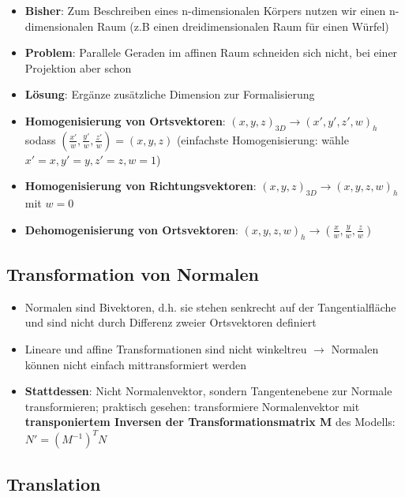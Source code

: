 \begin{itemize}
	\item \textbf{Bisher}: Zum Beschreiben eines n-dimensionalen Körpers nutzen wir einen n-dimensionalen Raum (z.B einen dreidimensionalen Raum für einen Würfel)
	\item \textbf{Problem}: Parallele Geraden im affinen Raum schneiden sich nicht, bei einer Projektion aber schon
	\item \textbf{Lösung}: Ergänze zusätzliche Dimension zur Formalisierung
	\item \textbf{Homogenisierung von Ortsvektoren}: $(x, y, z)_{3D} \rightarrow (x', y', z', w)_h$ sodass $(\frac{x'}{w}, \frac{y'}{w}, \frac{z'}{w}) = (x, y, z)$ (einfachste Homogenisierung: wähle $x' = x, y' = y, z' = z, w = 1$)
	\item \textbf{Homogenisierung von Richtungsvektoren}: $(x, y, z)_{3D} \rightarrow (x, y, z, w)_h$ mit $w = 0$
	\item \textbf{Dehomogenisierung von Ortsvektoren}: $(x, y, z, w)_h \rightarrow (\frac{x}{w}, \frac{y}{w}, \frac{z}{w})$
\end{itemize}

\subsection{Transformation von Normalen}%
\label{tf:sub:transformation_von_normalen}

\begin{itemize}
	\item Normalen sind Bivektoren, d.h. sie stehen senkrecht auf der Tangentialfläche und sind nicht durch Differenz zweier Ortsvektoren definiert
	\item Lineare und affine Transformationen sind nicht winkeltreu $\rightarrow$ Normalen können nicht einfach mittransformiert werden
	\item \textbf{Stattdessen}: Nicht Normalenvektor, sondern Tangentenebene zur Normale transformieren; praktisch gesehen: transformiere Normalenvektor mit \textbf{transponiertem Inversen der Transformationsmatrix M} des Modells: $N' = (M^{-1})^T N$
\end{itemize}

\newpage
\subsection{Translation}%
\label{tf:sub:translation}

